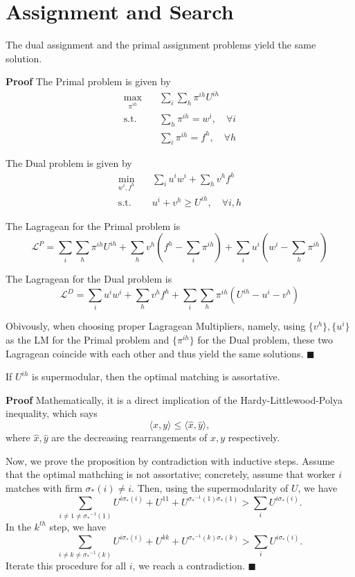 \chapter{Assignment and Search}

\begin{proposition}
The dual assignment and the primal assignment problems yield the same solution.
\end{proposition}

\noindent \textbf{Proof}
The Primal problem is given by 
\begin{align*}
    \max_{\pi^{ih}} \quad & \sum_i \sum_h \pi^{ih} U^{ih} \\
    \text{s.t.} \quad & \sum_h \pi^{ih} = w^i, \quad \forall i \\
    & \sum_i \pi^{ih} = f^h, \quad \forall h 
\end{align*}

The Dual problem is given by 
\begin{align*}
    \min_{w^{i}, f^h} \quad & \sum_i  u^i w^i + \sum_h v^h f^h \\
    \text{s.t.} \quad & u^i + v^h \geq U^{ih}, \quad \forall i, h
\end{align*}

The Lagragean for the Primal problem is
\[
\mathcal{L}^P = \sum_i \sum_h  \pi^{ih} U^{ih} + \sum_h v^h \left( f^h - \sum_i \pi^{ih} \right) + \sum_i u^i \left(w^i - \sum_h \pi^{ih} \right)
\]

The Lagragean for the Dual problem is
\[
\mathcal{L}^D = \sum_i  u^i w^i + \sum_h v^h f^h + \sum_i \sum_h \pi^{ih} \left( U^{ih} -  u^i  - v^h \right)
\]

Obivously, when choosing proper Lagragean Multipliers,
namely, using $\{v^h\}, \{ u^i \}$ as the LM for the Primal problem and 
$\{\pi^{ih} \}$ for the Dual problem, 
these two Lagragean coincide with each other and thus yield the same solutions. \(\blacksquare\)


\begin{proposition}
    If $U^{ih}$ is supermodular, then the optimal matching is assortative.
\end{proposition}
\noindent \textbf{Proof}
Mathematically, it is a direct implication of the Hardy-Littlewood-Polya inequality, which says
\[
\langle x, y \rangle \leq \langle \hat{x}, \hat{y} \rangle,
\]
where $\hat{x}, \hat{y}$ are the decreasing rearrangements of $x, y$ respectively.

Now, we prove the proposition by contradiction with inductive steps.
Assume that the optimal mathching is not assortative;
concretely, assume that worker $i$ matches with firm $\sigma_*(i) \neq i$.
Then, using the supermodularity of $U$, we have 
\[
\sum_{i \neq 1 \neq {\sigma_*}^{-1}(1)} U^{i \sigma_*(i)} + U^{11} + U^{{\sigma_*}^{-1}(1) \sigma_*(1)} > \sum_i U^{i \sigma_*(i)}. 
\]
In the $k^{th}$ step, we have 
\[
\sum_{i \neq k \neq {\sigma_*}^{-1}(k)} U^{i \sigma_*(i)} + U^{kk} + U^{{\sigma_*}^{-1}(k) \sigma_*(k)} > \sum_i U^{i \sigma_*(i)}. 
\]
Iterate this procedure for all $i$, we reach a contradiction. \(\blacksquare\)


